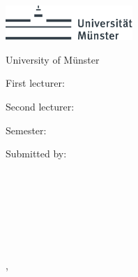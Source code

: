 \thispagestyle{empty} 

\begin{center}
    \includegraphics[height=1.3cm]{logos/unims.pdf}
    \hfill
    \par
    \vspace*{12ex}
    {
        \linespread{0.9}
        \LARGE
        \printtitle{}
        \par
    }
    \normalsize
    \vspace*{8ex}
    \large
    \normalsize
    \vspace*{6ex}
    University of Münster\\
    \printinstitute{}
\end{center}

\par
\vspace*{16ex}

\begin{minipage}[t]{0.5\textwidth}
    \centering

    First lecturer:\\
    \large
    \textit{\printFirstLecturer}

    \par
    \normalsize
    \vspace*{4ex}
    Second lecturer:\\
    \large
    \textit{\printSecondLecturer}

    \par
    \normalsize
    \vspace*{4ex}
    Semester:\\
    \large
    \textit{\printterm}
\end{minipage}
\hfill
\begin{minipage}[t]{0.5\textwidth}
    \centering

    Submitted by:\\
    \large
    \textit{\printnameMaxi} \\
    \printnumberMaxi{} \\
    \vspace*{4ex}

    \textit{\printnameTimo} \\
    \printnumberTimo{} \\
    \vspace*{4ex}

    \textit{\printnameHendrik} \\
    \printnumberHendrik{}

    \par
    \normalsize
    \vspace*{4ex}
    \printcity, \makeatletter
    \monthname{}
    \makeatother~\the\year{}
\end{minipage}
